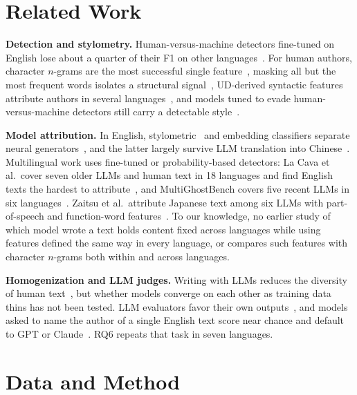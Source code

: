 \documentclass[conference,compsoc]{IEEEtran}
\begin{document}
\section{Related Work}
\textbf{Detection and stylometry.} Human-versus-machine detectors fine-tuned on English lose about a quarter of their F1 on other languages~\cite{macko2023multitude}. For human authors, character $n$-grams are the most successful single feature~\cite{sapkota2015ngrams}, masking all but the most frequent words isolates a structural signal~\cite{stamatatos2017distortion}, UD-derived syntactic features attribute authors in several languages~\cite{gorman2022ud}, and models tuned to evade human-versus-machine detectors still carry a detectable style~\cite{riverasoto2026attacks}.

\textbf{Model attribution.} In English, stylometric~\cite{kumarage2023neural} and embedding classifiers separate neural generators~\cite{uchendu2020authorship}, and the latter largely survive LLM translation into Chinese~\cite{sun2025idiosyncrasies}. Multilingual work uses fine-tuned or probability-based detectors: La Cava et al.\ cover seven older LLMs and human text in 18 languages and find English texts the hardest to attribute~\cite{lacava2026multilingual}, and MultiGhostBench covers five recent LLMs in six languages~\cite{greco2026multighost}. Zaitsu et al.\ attribute Japanese text among six LLMs with part-of-speech and function-word features~\cite{zaitsu2026fingerprint}. To our knowledge, no earlier study of which model wrote a text holds content fixed across languages while using features defined the same way in every language, or compares such features with character $n$-grams both within and across languages.

\textbf{Homogenization and LLM judges.} Writing with LLMs reduces the diversity of human text~\cite{padmakumar2024diversity}, but whether models converge on each other as training data thins has not been tested. LLM evaluators favor their own outputs~\cite{panickssery2024self}, and models asked to name the author of a single English text score near chance and default to GPT or Claude~\cite{bai2025selfrecognition}. RQ6 repeats that task in seven languages.

\section{Data and Method}
\end{document}
